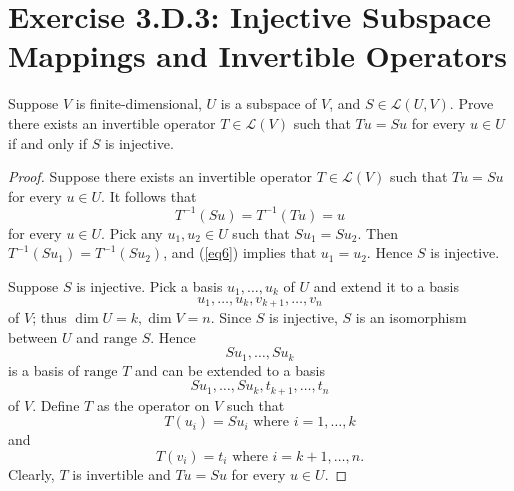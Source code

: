 \section{Exercise 3.D.3: Injective Subspace Mappings and Invertible Operators}
Suppose $V$ is finite-dimensional, $U$ is a subspace of $V$, and $S\in\mathcal{L}(U,V)$. Prove there exists an invertible operator $T\in\mathcal{L}(V)$ such that $Tu=Su$ for every $u\in U$ if and only if $S$ is injective.
\begin{proof}
Suppose there exists an invertible operator $T\in\mathcal{L}(V)$ such that $Tu=Su$ for every $u\in U$. It follows that
\begin{equation}
\label{eq6}
T^{-1}(Su)=T^{-1}(Tu)=u
\end{equation}
for every $u\in U$. Pick any $u_1,u_2\in U$ such that $Su_1=Su_2$. Then $T^{-1}(Su_1)=T^{-1}(Su_2)$, and (\ref{eq6}) implies that $u_1=u_2$. Hence $S$ is injective.

Suppose $S$ is injective. Pick a basis $u_1,\dots,u_k$ of $U$ and extend it to a basis\[
u_1,\dots,u_k,v_{k+1},\dots,v_n
\]of $V$; thus $\dim U = k, \dim V=n$. Since $S$ is injective, $S$ is an isomorphism between $U$ and $\text{range }S$. Hence \[
Su_1,\dots,Su_k
\]is a basis of $\text{range }T$ and can be extended to a basis\[
Su_1,\dots,Su_k,t_{k+1},\dots,t_{n}
\]of $V$. Define $T$ as the operator on $V$ such that\[
T(u_i)=Su_i\text{ where }i=1,\dots,k
\]and\[
T(v_i)=t_i\text{ where }i=k+1,\dots,n.
\]Clearly, $T$ is invertible and $Tu=Su$ for every $u\in U$.
\end{proof}
